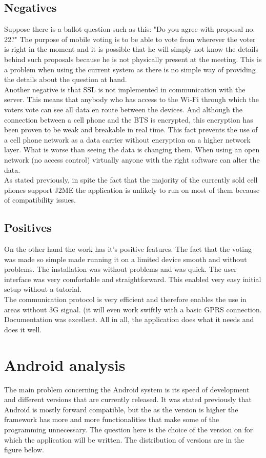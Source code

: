 \documentclass[11pt,twoside,a4paper]{book}
\begin{document}
\subsection{Negatives}
Suppose there is a ballot question such as this: "Do you agree with proposal no. 22?" The purpose of mobile voting is to be able to vote from wherever the voter is right in the moment and it is possible that he will simply not know the details behind such proposals because he is not physically present at the meeting. This is a problem when using the current system as there is no simple way of providing the details about the question at hand.\\
Another negative is that SSL is not implemented in communication with the server. This means that anybody who has access to the Wi-Fi through which the voters vote can see all data en route between the devices. And although the connection between a cell phone and the BTS\cite{whatISBTS}  is encrypted, this encryption has been proven to be weak\cite{GSMCypherWeakness} and breakable in real time. This fact  prevents the use of a cell phone network as a data carrier without encryption on a higher network layer. What is worse than seeing the data is changing them. When using an open network (no access control) virtually anyone with the right software can alter the data.\\
As stated previously, in spite the fact that the majority of the currently sold cell phones support J2ME the application is unlikely to run on most of them because of compatibility issues.\cite{bakalarkaJV}

\subsection{Positives}
On the other hand the work has it's positive features. The fact that the voting was made so simple made running it on a limited device smooth and without problems. The installation was without problems and was quick. The user interface was very comfortable and straightforward. This enabled very easy initial setup without a tutorial.\\
The communication protocol is very efficient and therefore enables the use in areas without 3G signal. (it will even work swiftly with a basic GPRS connection. Documentation was excellent. All in all, the application does what it needs and does it well.




\section{Android analysis}
The main problem concerning the Android system is its speed of development and different versions that are currently released. It was stated previously that Android is mostly forward compatible, but the as the version is higher the framework has more and more functionalities that make some of the programming unnecessary. The question here is the choice of the version on for which the application will be written. The distribution of versions are in the figure below.
\end{document}
